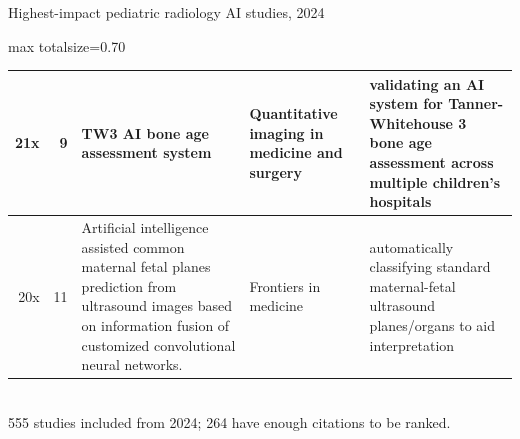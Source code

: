 \documentclass[aspectratio=169]{beamer}
\begin{document}
\begin{frame}[category=Journals/Preprints]{Highest-impact pediatric radiology AI studies, 2024}
\begin{adjustbox}{max totalsize={\textwidth}{0.70\textheight}}
\begin{tabular}{|r|r|>{\raggedright\arraybackslash}p{}|>{\raggedright\arraybackslash}p{}|>{\raggedright\arraybackslash}p{}|}
21x & 9 & TW3 AI bone age assessment system & Quantitative imaging in medicine and surgery & validating an AI system for Tanner-Whitehouse 3 bone age assessment across multiple children's hospitals \\ \hline
20x & 11 & Artificial intelligence assisted common maternal fetal planes prediction from ultrasound images based on information fusion of customized convolutional neural networks. & Frontiers in medicine & automatically classifying standard maternal-fetal ultrasound planes/organs to aid interpretation \\ \hline
\end{tabular}
\end{adjustbox}
\\[2pt]
{\tiny 555 studies included from 2024; 264 have enough citations to be ranked. }
\end{frame}
\end{document}
